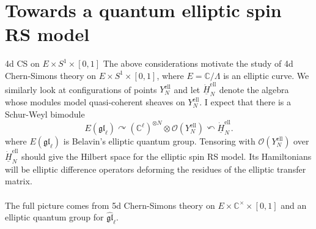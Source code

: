 \documentclass[11pt]{beamer}
\theoremstyle{remark}
\theoremstyle{remark}
\newcommand{\C}{\mathbb{C}}
\begin{document}
\section{Towards a quantum elliptic spin RS model}

\begin{frame}{4d CS on $E \times S^1 \times [0,1]$}
The above considerations motivate the study of 4d Chern-Simons theory on $E \times S^1 \times [0,1]$, where $E = \C/\Lambda$ is an elliptic curve. We similarly look at configurations of points $Y_N^\text{ell}$ and let $\underline{\dot H}_N^\text{ell}$ denote the algebra whose modules model quasi-coherent sheaves on $Y_N^\text{ell}$. I expect that there is a Schur-Weyl bimodule
\begin{equation*}
E(\mathfrak{gl}_\ell) \curvearrowright (\C^\ell)^{\otimes N} \otimes \mathcal{O}(Y_N^\text{ell}) \curvearrowleft \underline{\dot H}_N^\text{ell}.
\end{equation*}
where $E(\mathfrak{gl}_\ell)$ is Belavin's elliptic quantum group. Tensoring with $\mathcal{O}(Y_N^\text{ell})$ over $\underline{\dot H}_N^\text{ell}$ should give the Hilbert space for the elliptic spin RS model. Its Hamiltonians will be elliptic difference operators deforming the residues of the elliptic transfer matrix.
\\~\\
The full picture comes from 5d Chern-Simons theory on $E \times \C^\times \times [0,1]$ and an elliptic quantum group for $\widehat{\mathfrak{gl}}_\ell$.
\end{frame}

\begin{frame}[allowframebreaks]


\end{frame}
\end{document}
